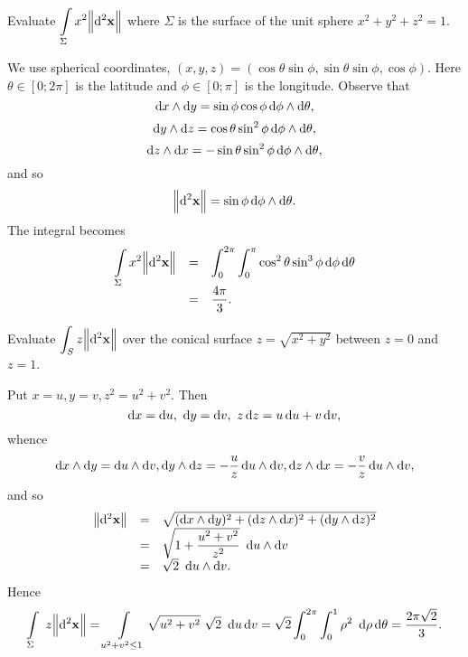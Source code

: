 \begin{problem}
Evaluate $\dint \limits_\Sigma x^2 \norm{\d{ ^2\vector{x}}}$ where
$\Sigma$ is the surface of the unit sphere $x^2 + y^2 + z^2 = 1.$
\begin{answer} We use spherical coordinates, $(x, y, z) =
(\cos\theta\sin\phi, \sin\theta\sin\phi, \cos\phi)$. Here $\theta
\in [0; 2\pi]$ is the latitude and $\phi \in [0; \pi]$ is the
longitude. Observe that
$$\d{x}\wedge\d{y}=
\sin\phi\cos\phi \d{\phi}\wedge\d{\theta} ,$$
$$\d{y}\wedge\d{z} = \cos\theta\sin^2\phi \d{\phi}\wedge\d{\theta},
$$
$$\d{z}\wedge\d{x}= -\sin\theta\sin^2\phi \d{\phi}\wedge\d{\theta},
$$and so
$$\norm{\d{ ^2 \vector{x}}} = \sin\phi \d{\phi}\wedge\d{\theta}.$$
The integral becomes
$$\begin{array}{lll}
\dint \limits_\Sigma x^2 \norm{\d{ ^2\vector{x}}} & = & \dint _0 ^{2\pi}
\dint _{0} ^{\pi} \cos^2\theta\sin^3\phi \d{\phi}  \d{\theta} \\
& = & \dfrac{4\pi}{3}.
\end{array}$$
\end{answer}
\end{problem}
\begin{problem}
Evaluate $\dint _S z\norm{\d{ ^2\vector{x}}}$ over the conical surface
$z=\sqrt{x^2 + y^2}$ between $z=0$ and $z=1$. \begin{answer} Put $x
= u, y = v, z^2 = u^2 + v^2$. Then
$$\d{x} = \d{u}, \ \d{y} = \d{v}, \ z\d{z} = u\d{u} + v\d{v},    $$
whence
$$\d{x} \wedge \d{y} =  \d{u} \wedge \d{v}, \d{y} \wedge \d{z} = -\dfrac{u}{z}  \d{u} \wedge \d{v},
\d{z} \wedge \d{x} = -\dfrac{v}{z}  \d{u} \wedge \d{v},  $$ and so
$$\begin{array}{lll}\norm{\d{ ^2\vector{x}}} & = &  \sqrt{(\d{x} \wedge \d{y})^2 + (\d{z} \wedge \d{x})^2 + (\d{y} \wedge \d{z})^2} \\
& = & \sqrt{1 + \dfrac{u^2 + v^2}{z^2}}\ \d{u}\wedge\d{v} \\ &  = &
\sqrt{2}\ \d{u}\wedge\d{v}.
\end{array}$$ Hence $$\dint \limits_{\Sigma} \ z\norm{\d{ ^2\vector{x}}} =
\dint\limits_{u^2 + v^2 \leq 1} \sqrt{u^2 + v^2}\ \sqrt{2}\
\d{u}\d{v} = \sqrt{2}\dint _0 ^{2\pi}\dint _0 ^1  \rho^2\
\d{\rho}\d{\theta} = \dfrac{2\pi\sqrt{2}}{3}.
$$
\end{answer}
\end{problem}

